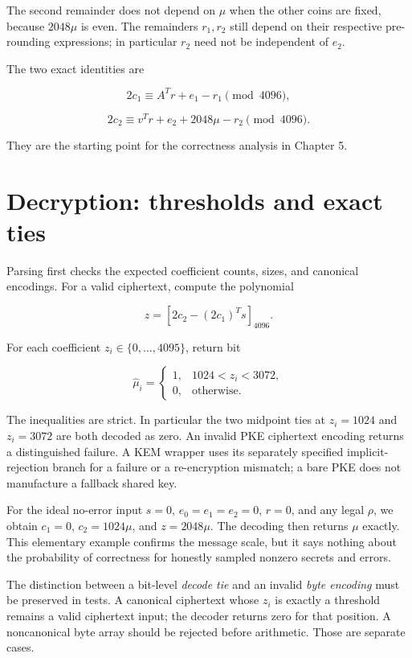 \documentclass[
  11pt,
  a4paper,
  oneside]{report}
\begin{document}
The second remainder does not depend on \(\mu\) when the other coins are
fixed, because \(2048\mu\) is even. The remainders \(r_1,r_2\) still
depend on their respective pre-rounding expressions; in particular
\(r_2\) need not be independent of \(e_2\).

The two exact identities are

\[
2c_1\equiv A^Tr+e_1-r_1\pmod{4096},
\]

\[
2c_2\equiv v^Tr+e_2+2048\mu-r_2\pmod{4096}.
\]

They are the starting point for the correctness analysis in Chapter 5.

\section{Decryption: thresholds and exact
ties}\label{decryption-thresholds-and-exact-ties}

Parsing first checks the expected coefficient counts, sizes, and
canonical encodings. For a valid ciphertext, compute the polynomial

\[
z=[2c_2-(2c_1)^Ts]_{4096}.
\]

For each coefficient \(z_i\in\{0,\ldots,4095\}\), return bit

\[
\widehat\mu_i=
\begin{cases}
1,&1024<z_i<3072,\\
0,&\text{otherwise}.
\end{cases}
\]

The inequalities are strict. In particular the two midpoint ties at
\(z_i=1024\) and \(z_i=3072\) are both decoded as zero. An invalid PKE
ciphertext encoding returns a distinguished failure. A KEM wrapper uses
its separately specified implicit-rejection branch for a failure or a
re-encryption mismatch; a bare PKE does not manufacture a fallback
shared key.

For the ideal no-error input \(s=0\), \(e_0=e_1=e_2=0\), \(r=0\), and
any legal \(\rho\), we obtain \(c_1=0\), \(c_2=1024\mu\), and
\(z=2048\mu\). The decoding then returns \(\mu\) exactly. This
elementary example confirms the message scale, but it says nothing about
the probability of correctness for honestly sampled nonzero secrets and
errors.

The distinction between a bit-level \emph{decode tie} and an invalid
\emph{byte encoding} must be preserved in tests. A canonical ciphertext
whose \(z_i\) is exactly a threshold remains a valid ciphertext input;
the decoder returns zero for that position. A noncanonical byte array
should be rejected before arithmetic. Those are separate cases.
\end{document}
